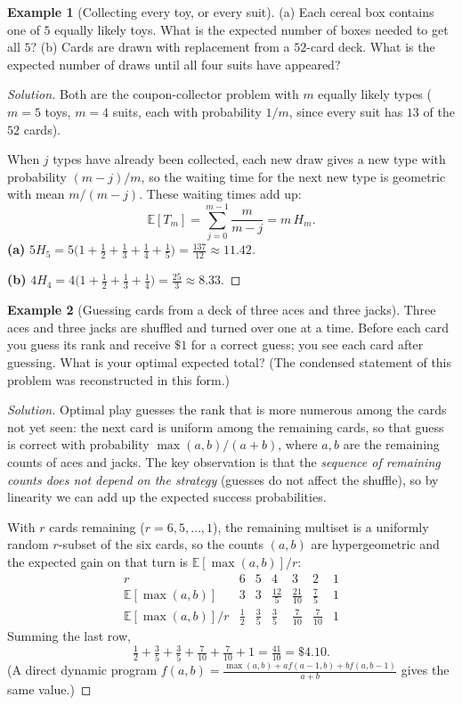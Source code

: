 \documentclass[11pt]{article}
\theoremstyle{definition}
\newtheorem{example}{Example}[section]
\newcommand{\E}{\mathbb{E}}
\begin{document}
\begin{example}[Collecting every toy, or every suit]
(a) Each cereal box contains one of $5$ equally likely toys. What is the expected number of boxes needed to get all $5$? (b) Cards are drawn with replacement from a $52$-card deck. What is the expected number of draws until all four suits have appeared?
\end{example}

\begin{proof}[Solution]
Both are the coupon-collector problem with $m$ equally likely types ($m=5$ toys, $m=4$ suits, each with probability $1/m$, since every suit has $13$ of the $52$ cards).

When $j$ types have already been collected, each new draw gives a new type with probability $(m-j)/m$, so the waiting time for the next new type is geometric with mean $m/(m-j)$. These waiting times add up:
\[
\E[T_m]=\sum_{j=0}^{m-1}\frac m{m-j}=m\,H_m.
\]
\textbf{(a)} $5H_5=5\bigl(1+\tfrac12+\tfrac13+\tfrac14+\tfrac15\bigr)=\boxed{\tfrac{137}{12}\approx11.42}$.

\textbf{(b)} $4H_4=4\bigl(1+\tfrac12+\tfrac13+\tfrac14\bigr)=\boxed{\tfrac{25}3\approx8.33}$.
\end{proof}

\begin{example}[Guessing cards from a deck of three aces and three jacks]
Three aces and three jacks are shuffled and turned over one at a time. Before each card you guess its rank and receive $\$1$ for a correct guess; you see each card after guessing. What is your optimal expected total? (The condensed statement of this problem was reconstructed in this form.)
\end{example}

\begin{proof}[Solution]
Optimal play guesses the rank that is more numerous among the cards not yet seen: the next card is uniform among the remaining cards, so that guess is correct with probability $\max(a,b)/(a+b)$, where $a,b$ are the remaining counts of aces and jacks. The key observation is that the \emph{sequence of remaining counts does not depend on the strategy} (guesses do not affect the shuffle), so by linearity we can add up the expected success probabilities.

With $r$ cards remaining ($r=6,5,\dots,1$), the remaining multiset is a uniformly random $r$-subset of the six cards, so the counts $(a,b)$ are hypergeometric and the expected gain on that turn is $\E[\max(a,b)]/r$:
\[
\begin{array}{c|cccccc}
r&6&5&4&3&2&1\\\hline
\E[\max(a,b)]&3&3&\tfrac{12}5&\tfrac{21}{10}&\tfrac75&1\\
\E[\max(a,b)]/r&\tfrac12&\tfrac35&\tfrac35&\tfrac7{10}&\tfrac7{10}&1
\end{array}
\]
Summing the last row,
\[
\tfrac12+\tfrac35+\tfrac35+\tfrac7{10}+\tfrac7{10}+1=\boxed{\tfrac{41}{10}=\$4.10}.
\]
(A direct dynamic program $f(a,b)=\frac{\max(a,b)+a f(a-1,b)+b f(a,b-1)}{a+b}$ gives the same value.)
\end{proof}
\end{document}
